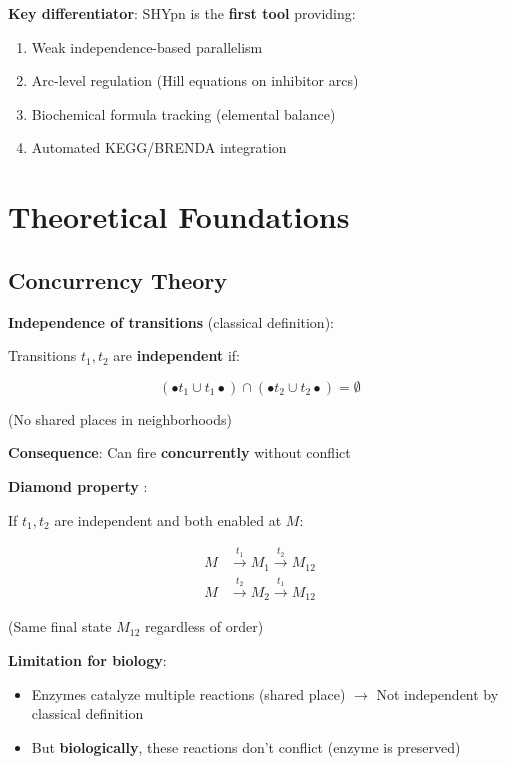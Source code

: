 \textbf{Key differentiator}: SHYpn is the \textbf{first tool} providing:

\begin{enumerate}
    \item Weak independence-based parallelism
    \item Arc-level regulation (Hill equations on inhibitor arcs)
    \item Biochemical formula tracking (elemental balance)
    \item Automated KEGG/BRENDA integration
\end{enumerate}

\section{Theoretical Foundations}
\label{sec:theoretical-foundations}

\subsection{Concurrency Theory}
\label{subsec:concurrency-theory}

\textbf{Independence of transitions} (classical definition):

Transitions $t_1, t_2$ are \textbf{independent} if:

\begin{equation}
(\bullet t_1 \cup t_1\bullet) \cap (\bullet t_2 \cup t_2\bullet) = \emptyset
\end{equation}

(No shared places in neighborhoods)

\textbf{Consequence}: Can fire \textbf{concurrently} without conflict

\textbf{Diamond property} \citep{Mazurkiewicz1987}:

If $t_1, t_2$ are independent and both enabled at $M$:

\begin{align}
M &\xrightarrow{t_1} M_1 \xrightarrow{t_2} M_{12} \\
M &\xrightarrow{t_2} M_2 \xrightarrow{t_1} M_{12}
\end{align}

(Same final state $M_{12}$ regardless of order)

\textbf{Limitation for biology}:

\begin{itemize}
    \item Enzymes catalyze multiple reactions (shared place) $\to$ Not independent by classical definition
    \item But \textbf{biologically}, these reactions don't conflict (enzyme is preserved)
\end{itemize}

